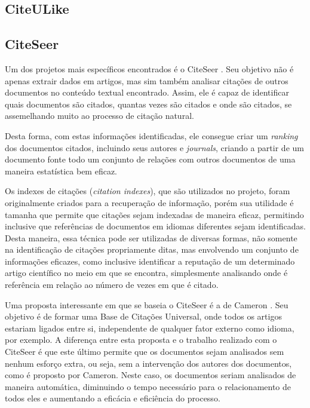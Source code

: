 \subsection{CiteULike}
\label{tec-citeulike}


\subsection{CiteSeer}

Um dos projetos mais específicos encontrados é o CiteSeer \cite{citeseer}. Seu objetivo não é apenas extrair dados em artigos, mas sim também analisar citações de outros documentos no conteúdo textual encontrado. Assim, ele é capaz de identificar quais documentos são citados, quantas vezes são citados e onde são citados, se assemelhando muito ao processo de citação natural.

Desta forma, com estas informações identificadas, ele consegue criar um \textit{ranking} dos documentos citados, incluindo seus autores e \textit{journals}, criando a partir de um documento fonte todo um conjunto de relações com outros documentos de uma maneira estatística bem eficaz.

Os indexes de citações (\textit{citation indexes}), que são utilizados no projeto, foram originalmente criados para a recuperação de informação, porém sua utilidade é tamanha que permite que citações sejam indexadas de maneira eficaz, permitindo inclusive que referências de documentos em idiomas diferentes sejam identificadas. Desta maneira, essa técnica pode ser utilizadas de diversas formas, não somente na identificação de citações propriamente ditas, mas envolvendo um conjunto de informações eficazes, como inclusive identificar a reputação de um determinado artigo científico no meio em que se encontra, simplesmente analisando onde é referência em relação ao número de vezes em que é citado.

Uma proposta interessante em que se baseia o CiteSeer é a de Cameron \cite{cameron}. Seu objetivo é de formar uma Base de Citações Universal, onde todos os artigos estariam ligados entre si, independente de qualquer fator externo como idioma, por exemplo. A diferença entre esta proposta e o trabalho realizado com o CiteSeer é que este último permite que os documentos sejam analisados sem nenhum esforço extra, ou seja, sem a intervenção dos autores dos documentos, como é proposto por Cameron. Neste caso, os documentos seriam analisados de maneira automática, diminuindo o tempo necessário para o relacionamento de todos eles e aumentando a eficácia e eficiência do processo.

